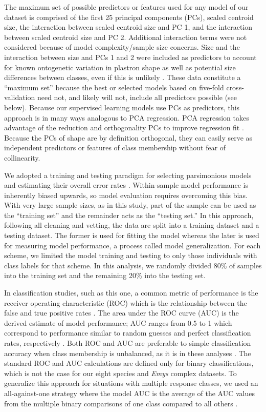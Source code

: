 \documentclass[10pt,letterpaper]{article}
\begin{document}
The maximum set of possible predictors or features used for any model of our dataset is comprised of the first 25 principal components (PCs), scaled centroid size, the interaction between scaled centroid size and PC 1, and the interaction between scaled centroid size and PC 2. Additional interaction terms were not considered because of model complexity/sample size concerns. Size and the interaction between size and PCs 1 and 2 were included as predictors to account for known ontogenetic variation in plastron shape \cite{Angielczyk2013a} as well as potential size differences between classes, even if this is unlikely \cite{Seeliger1945,Holland1992}. These data constitute a ``maximum set'' because the best or selected models based on five-fold cross-validation need not, and likely will not, include all predictors possible (see below). Because our supervised learning models use PCs as predictors, this approach is in many ways analogous to PCA regression. PCA regression takes advantage of the reduction and orthogonality PCs to improve regression fit \cite{Hastie2009}. Because the PCs of shape are by definition orthogonal, they can easily serve as independent predictors or features of class membership without fear of collinearity.


We adopted a training and testing paradigm for selecting parsimonious models and estimating their overall error rates \cite{Hastie2009,Kuhn2013}. Within-sample model performance is inherently biased upwards, so model evaluation requires overcoming this bias. With very large sample sizes, as in this study, part of the sample can be used as the ``training set'' and the remainder acts as the ``testing set.'' In this approach, following all cleaning and vetting, the data are split into a training dataset and a testing dataset. The former is used for fitting the model whereas the later is used for measuring model performance, a process called model generalization. For each scheme, we limited the model training and testing to only those individuals with class labels for that scheme. In this analysis, we randomly divided 80\% of samples into the training set and the remaining 20\% into the testing set. 

In classification studies, such as this one, a common metric of performance is the receiver operating characteristic (ROC) which is the relationship between the false and true positive rates \cite{Hastie2009}. The area under the ROC curve (AUC) is the derived estimate of model performance; AUC ranges from 0.5 to 1 which correspond to performance similar to random guesses and perfect classification rates, respectively \cite{Hastie2009}. Both ROC and AUC are preferable to simple classification accuracy when class membership is unbalanced, as it is in these analyses \cite{Hastie2009}. The standard ROC and AUC calculations are defined only for binary classifications, which is not the case for our eight species and \textit{Emys} complex datasets. To generalize this approach for situations with multiple response classes, we used an all-against-one strategy where the model AUC is the average of the AUC values from the multiple binary comparisons of one class compared to all others \cite{Hand2001}. 
\end{document}
